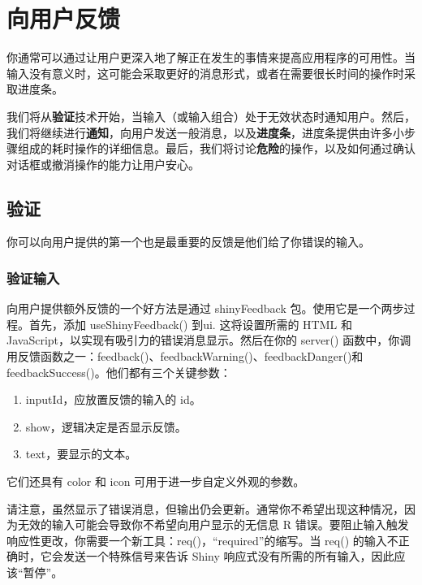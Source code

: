 \chapter{向用户反馈\label{ch08}}
你通常可以通过让用户更深入地了解正在发生的事情来提高应用程序的可用性。当输入没有意义时，这可能会采取更好的消息形式，或者在需要很长时间的操作时采取进度条。

我们将从\textbf{验证}技术开始，当输入（或输入组合）处于无效状态时通知用户。然后，我们将继续进行\textbf{通知}，向用户发送一般消息，以及\textbf{进度条}，进度条提供由许多小步骤组成的耗时操作的详细信息。最后，我们将讨论\textbf{危险}的操作，以及如何通过确认对话框或撤消操作的能力让用户安心。

\section{验证}
你可以向用户提供的第一个也是最重要的反馈是他们给了你错误的输入。

\subsection{验证输入}
向用户提供额外反馈的一个好方法是通过 shinyFeedback 包。使用它是一个两步过程。首先，添加 useShinyFeedback() 到ui. 这将设置所需的 HTML 和 JavaScript，以实现有吸引力的错误消息显示。然后在你的 server() 函数中，你调用反馈函数之一：feedback()、feedbackWarning()、feedbackDanger()和 feedbackSuccess()。他们都有三个关键参数：
\begin{enumerate}
    \item inputId，应放置反馈的输入的 id。
    \item show，逻辑决定是否显示反馈。
    \item text，要显示的文本。
\end{enumerate}
它们还具有 color 和 icon 可用于进一步自定义外观的参数。


请注意，虽然显示了错误消息，但输出仍会更新。通常你不希望出现这种情况，因为无效的输入可能会导致你不希望向用户显示的无信息 R 错误。要阻止输入触发响应性更改，你需要一个新工具：req()，“required”的缩写。当 req() 的输入不正确时，它会发送一个特殊信号来告诉 Shiny 响应式没有所需的所有输入，因此应该“暂停”。
